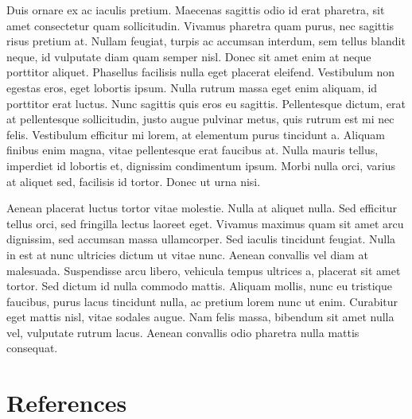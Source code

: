 \documentclass[
  letterpaper,
  DIV=11,
  numbers=noendperiod]{scrreprt}
\newlength{\cslhangindent}
\newenvironment{CSLReferences}[2] %
 {\begin{list}{}{%
  \setlength{\itemindent}{0pt}
  \setlength{\leftmargin}{0pt}
  \setlength{\parsep}{0pt}
  \ifodd #1
   \setlength{\leftmargin}{\cslhangindent}
   \setlength{\itemindent}{-1\cslhangindent}
  \fi
  \setlength{\itemsep}{#2\baselineskip}}}
 {\end{list}}
\begin{document}
Duis ornare ex ac iaculis pretium. Maecenas sagittis odio id erat
pharetra, sit amet consectetur quam sollicitudin. Vivamus pharetra quam
purus, nec sagittis risus pretium at. Nullam feugiat, turpis ac accumsan
interdum, sem tellus blandit neque, id vulputate diam quam semper nisl.
Donec sit amet enim at neque porttitor aliquet. Phasellus facilisis
nulla eget placerat eleifend. Vestibulum non egestas eros, eget lobortis
ipsum. Nulla rutrum massa eget enim aliquam, id porttitor erat luctus.
Nunc sagittis quis eros eu sagittis. Pellentesque dictum, erat at
pellentesque sollicitudin, justo augue pulvinar metus, quis rutrum est
mi nec felis. Vestibulum efficitur mi lorem, at elementum purus
tincidunt a. Aliquam finibus enim magna, vitae pellentesque erat
faucibus at. Nulla mauris tellus, imperdiet id lobortis et, dignissim
condimentum ipsum. Morbi nulla orci, varius at aliquet sed, facilisis id
tortor. Donec ut urna nisi.

Aenean placerat luctus tortor vitae molestie. Nulla at aliquet nulla.
Sed efficitur tellus orci, sed fringilla lectus laoreet eget. Vivamus
maximus quam sit amet arcu dignissim, sed accumsan massa ullamcorper.
Sed iaculis tincidunt feugiat. Nulla in est at nunc ultricies dictum ut
vitae nunc. Aenean convallis vel diam at malesuada. Suspendisse arcu
libero, vehicula tempus ultrices a, placerat sit amet tortor. Sed dictum
id nulla commodo mattis. Aliquam mollis, nunc eu tristique faucibus,
purus lacus tincidunt nulla, ac pretium lorem nunc ut enim. Curabitur
eget mattis nisl, vitae sodales augue. Nam felis massa, bibendum sit
amet nulla vel, vulputate rutrum lacus. Aenean convallis odio pharetra
nulla mattis consequat.


\chapter*{References}\label{references}


\label{refs}
\begin{CSLReferences}{0}{1}
\end{CSLReferences}
\end{document}

